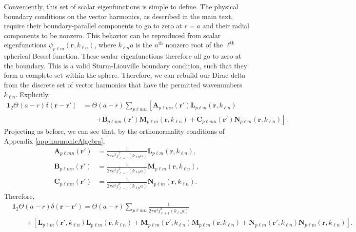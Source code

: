Conveniently, this set of scalar eigenfunctions is simple to define. The physical boundary conditions on the vector harmonics, as described in the main text, require their boundary-parallel components to go to zero at $r = a$ and their radial components to be nonzero. This behavior can be reproduced from scalar eigenfunctions $\psi_{p\ell m}(\mathbf{r},k_{\ell n})$, where $k_{\ell n}a$ is the $n^\mathrm{th}$ nonzero root of the $\ell^\mathrm{th}$ spherical Bessel function. These scalar eigenfunctions therefore all go to zero at the boundary. This is a valid Sturm-Liouville boundary condition, such that they form a complete set within the sphere. Therefore, we can rebuild our Dirac delta from the discrete set of vector harmonics that have the permitted wavenumbers $k_{\ell n}$. Explicitly,
\begin{equation}
\begin{split}
\bm{1}_2\Theta(a - r)\delta(\mathbf{r} - \mathbf{r}') &= \Theta(a - r)\sum_{p\ell m n}\left[\mathbf{A}_{p\ell mn}(\mathbf{r}')\mathbf{L}_{p\ell m}(\mathbf{r},k_{\ell n})\right.\\
&\qquad\left. + \mathbf{B}_{p\ell mn}(\mathbf{r}')\mathbf{M}_{p\ell m}(\mathbf{r},k_{\ell n}) + \mathbf{C}_{p\ell mn}(\mathbf{r}')\mathbf{N}_{p\ell m}(\mathbf{r},k_{\ell n})\right].
\end{split}
\end{equation}
Projecting as before, we can see that, by the orthonormality conditions of Appendix \ref{app:harmonicAlgebra},
\begin{equation}
\begin{split}
\mathbf{A}_{p\ell mn}(\mathbf{r}') &= \frac{1}{2\pi a^3j_{\ell + 1}^2(k_{\ell n}a)}\mathbf{L}_{p\ell m}(\mathbf{r},k_{\ell n}),\\
\mathbf{B}_{p\ell mn}(\mathbf{r}') &= \frac{1}{2\pi a^3j_{\ell + 1}^2(k_{\ell n}a)}\mathbf{M}_{p\ell m}(\mathbf{r},k_{\ell n}),\\
\mathbf{C}_{p\ell mn}(\mathbf{r}') &= \frac{1}{2\pi a^3j_{\ell + 1}^2(k_{\ell n}a)}\mathbf{N}_{p\ell m}(\mathbf{r},k_{\ell n}).
\end{split}
\end{equation}
Therefore,
\begin{equation}
\begin{split}
&\bm{1}_2\Theta(a - r)\delta(\mathbf{r} - \mathbf{r}') = \Theta(a - r)\sum_{p\ell m n}\frac{1}{2\pi a^3j_{\ell + 1}^2(k_{\ell n}a)}\\
&\qquad\times\left[\mathbf{L}_{p\ell m}(\mathbf{r}',k_{\ell n})\mathbf{L}_{p\ell m}(\mathbf{r},k_{\ell n}) + \mathbf{M}_{p\ell m}(\mathbf{r}',k_{\ell n})\mathbf{M}_{p\ell m}(\mathbf{r},k_{\ell n}) + \mathbf{N}_{p\ell m}(\mathbf{r}',k_{\ell n})\mathbf{N}_{p\ell m}(\mathbf{r},k_{\ell n})\right].
\end{split}
\end{equation}